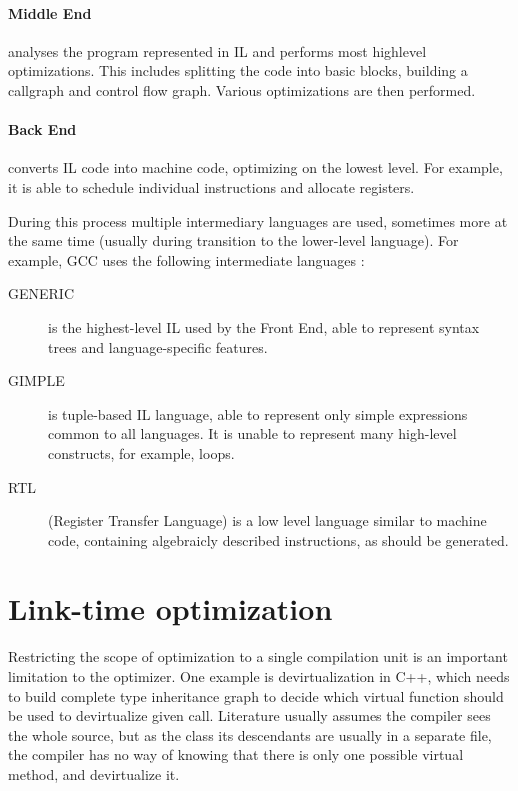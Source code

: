 \paragraph{Middle End} analyses the program represented in IL and performs most
highlevel optimizations. This includes splitting the code into basic blocks,
building a callgraph and control flow graph. Various optimizations are then
performed.

\paragraph{Back End} converts IL code into machine code, optimizing on the
lowest level. For example, it is able to schedule individual instructions and
allocate registers.

\bigskip

During this process multiple intermediary languages are used, sometimes more at
the same time (usually during transition to the lower-level language). For
example, GCC uses the following intermediate languages \cite{gccint}:

\begin{description}
	\item[GENERIC] is the highest-level IL used by the Front End, able to
		represent syntax trees and language-specific features.
	\item[GIMPLE] is tuple-based IL language, able to represent only simple
		expressions common to all languages. It is unable to represent many
		high-level constructs, for example, loops.
	\item[RTL] (Register Transfer Language) is a low level language similar to
		machine code, containing algebraicly described instructions, as should
		be generated.
\end{description}


\section{Link-time optimization}

Restricting the scope of optimization to a single compilation unit is an
important limitation to the optimizer. One example is devirtualization in C++,
which needs to build complete type inheritance graph to decide which virtual
function should be used to devirtualize given call. Literature usually assumes the
compiler sees the whole source, but as the class its descendants are usually in
a separate file, the compiler has no way of knowing that there is only one
possible virtual method, and devirtualize it.  

